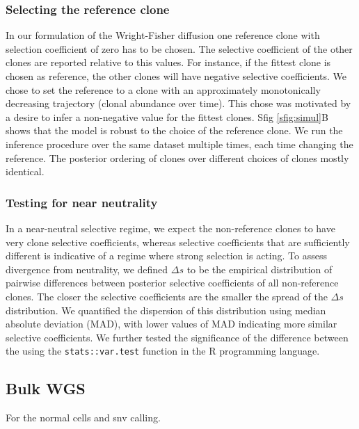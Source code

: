 \documentclass{article}
\begin{document}
\subsubsection{Selecting the reference clone}
\label{ssec:select_ref}
In our formulation of the Wright-Fisher diffusion one reference clone with selection coefficient of zero has to be chosen. 
The selective coefficient of the other clones are reported relative to this values. 
For instance, if the fittest clone is chosen as reference, the other clones will have negative selective coefficients. 
We chose to set the reference to a clone with an approximately monotonically decreasing trajectory (clonal abundance over time). 
This chose was motivated by a desire to infer a non-negative value for the fittest clones.
Sfig \ref{sfig:simul}B shows that the model is robust to the choice of the reference clone.
We run the inference procedure over the same dataset multiple times, each time changing the reference.
The posterior ordering of clones over different choices of clones mostly identical.


\subsubsection{Testing for near neutrality}
In a near-neutral selective regime, we expect the non-reference clones to have very clone selective coefficients, whereas selective coefficients that are sufficiently different is indicative of a regime where strong selection is acting.
To assess divergence from neutrality, we defined $\Delta s$ to be the empirical distribution of pairwise differences between posterior selective coefficients of all non-reference clones.
The closer the selective coefficients are the smaller the spread of the $\Delta s$ distribution. 
We quantified the dispersion of this distribution using median absolute deviation (MAD), with lower values of MAD indicating more similar selective coefficients. 
We further tested the significance of the difference between the 
using the \texttt{stats::var.test} function in the R programming language. 



\subsection{Bulk WGS}
For the normal cells and snv calling. 
\end{document}
